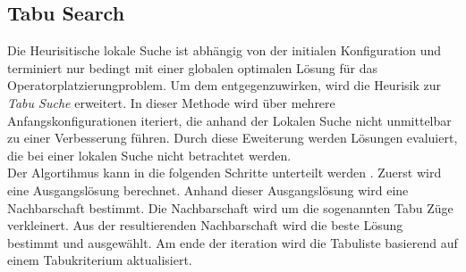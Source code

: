 \documentclass{article}
\begin{document}
 


\subsection{Tabu Search}
Die Heurisitische lokale Suche ist abhängig von der initialen Konfiguration und terminiert nur bedingt mit einer globalen optimalen Lösung für das Operatorplatzierungproblem. 
Um dem entgegenzuwirken, wird die Heurisik zur \textit{Tabu Suche} \cite{glover-tabu-search} erweitert.  In dieser Methode wird über mehrere Anfangskonfigurationen iteriert, 
die anhand der Lokalen Suche nicht unmittelbar zu einer Verbesserung führen. Durch diese Eweiterung
werden Lösungen evaluiert, die bei einer lokalen Suche nicht betrachtet werden. \\
Der Algortihmus kann in die folgenden Schritte unterteilt werden \cite{glover-tabu-search-tutorial}. Zuerst wird eine Ausgangslösung berechnet.
Anhand dieser Ausgangslösung wird eine Nachbarschaft bestimmt. Die Nachbarschaft wird um die sogenannten Tabu Züge verkleinert. 
Aus der resultierenden Nachbarschaft wird die beste Lösung bestimmt und ausgewählt. Am ende der iteration wird die Tabuliste basierend auf einem Tabukriterium aktualisiert.
\end{document}
